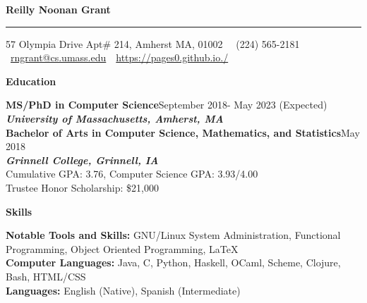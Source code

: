 \documentclass[9pt]{extarticle}
\begin{document}
\sffamily
\begin{huge}
\begin{center}
\textbf{Reilly Noonan Grant}
\end{center}
\end{huge}
\rule{19cm}{0.4pt}
\begin{center}
  57 Olympia Drive Apt\# 214, Amherst MA, 01002 \,
\textbullet\, (224) 565-2181 \textbullet\ \href{mailto:rngrant@cs.umass.edu}{rngrant@cs.umass.edu} \,\textbullet\, \href{https://pages0.github.io./}{https://pages0.github.io./}
\end{center}

\begin{large}
\begin{center}\textbf{Education}
\end{center}
\end{large}

\textbf{MS/PhD in Computer Science}\hfill September 2018- May 2023 (Expected)\\
\textbf{\textit{University of Massachusetts, Amherst, MA}}\\

\textbf{Bachelor of Arts in Computer Science, Mathematics, and Statistics}\hfill May 2018\\
\textbf{\textit{Grinnell College, Grinnell, IA}}\\
Cumulative GPA: 3.76, Computer Science GPA: 3.93/4.00  \\
Trustee Honor Scholarship: \$21,000 \\

\begin{large}
\begin{center}\textbf{Skills}
\end{center}
\end{large}
\textbf{Notable Tools and Skills:} GNU/Linux System Administration,
Functional Programming, Object Oriented Programming, \LaTeX  \\
\textbf{Computer Languages:} Java, C, Python, Haskell, OCaml, Scheme, Clojure, Bash,
HTML/CSS\\
\textbf{Languages:} English (Native), Spanish (Intermediate)
\end{document}

